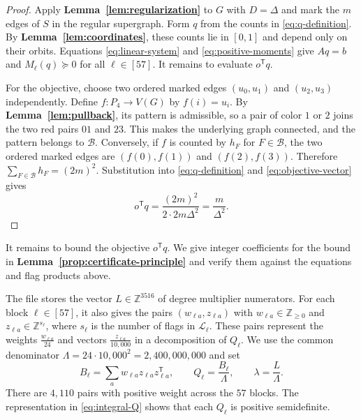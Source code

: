 \documentclass[preprint,11pt,numbers]{elsarticle-arxiv}
\numberwithin{equation}{section}
\theoremstyle{definition}
\begin{document}
\begin{proof}
Apply \textbf{Lemma~\ref{lem:regularization}} to $G$ with $D=\Delta$
and mark the $m$ edges of $S$ in the regular supergraph. Form $q$
from the counts in \eqref{eq:q-definition}. By
\textbf{Lemma~\ref{lem:coordinates}}, these counts lie in $[0,1]$
and depend only on their orbits. Equations \eqref{eq:linear-system}
and \eqref{eq:positive-moments} give $Aq=b$ and $M_\ell(q)\succeq0$
for all $\ell\in[57]$. It remains to evaluate $o^{\mathsf T}q$.

For the objective, choose two ordered marked edges $(u_0,u_1)$
and $(u_2,u_3)$ independently. Define $f\colon P_4\to V(G)$ by
$f(i)=u_i$. By \textbf{Lemma~\ref{lem:pullback}}, its pattern is
admissible, so a pair of color $1$ or $2$ joins the two red pairs
$01$ and $23$. This makes the underlying graph connected, and
the pattern belongs to $\mathcal B$. Conversely, if $f$ is counted
by $h_F$ for $F\in\mathcal B$, the two ordered marked edges are
$(f(0),f(1))$ and $(f(2),f(3))$. Therefore
$\sum_{F\in\mathcal B}h_F=(2m)^2$. Substitution into
\eqref{eq:q-definition} and
\eqref{eq:objective-vector} gives
\[
 o^{\mathsf T}q
 =\frac{(2m)^2}{2\cdot2m\Delta^2}
 =\frac{m}{\Delta^2}.
\]
\end{proof}

It remains to bound the objective $o^{\mathsf T}q$. We give integer
coefficients for the bound in \textbf{Lemma~\ref{prop:certificate-principle}}
and verify them against the equations and flag products above.

The file  stores
the vector $L\in\mathbb Z^{3516}$ of degree multiplier numerators.
For each block $\ell\in[57]$, it also gives the pairs
$(w_{\ell a},z_{\ell a})$ with $w_{\ell a}\in\mathbb Z_{\geq0}$ and
$z_{\ell a}\in\mathbb Z^{s_\ell}$, where $s_\ell$ is the number of
flags in $\mathcal L_\ell$. These pairs represent the weights
$\frac{w_{\ell a}}{24}$ and vectors $\frac{z_{\ell a}}{10{,}000}$
in a decomposition of $Q_\ell$. We use the common
denominator $\Lambda=24\cdot10{,}000^2=2{,}400{,}000{,}000$ and set
\begin{equation}\label{eq:integral-Q}
 B_\ell=\sum_a w_{\ell a}z_{\ell a}z_{\ell a}^{\mathsf T},
 \qquad Q_\ell=\frac{B_\ell}{\Lambda},
 \qquad \lambda=\frac{L}{\Lambda}.
\end{equation}
There are $4{,}110$ pairs with positive weight across the $57$ blocks.
The representation in \eqref{eq:integral-Q} shows that each $Q_\ell$
is positive semidefinite.
\end{document}
